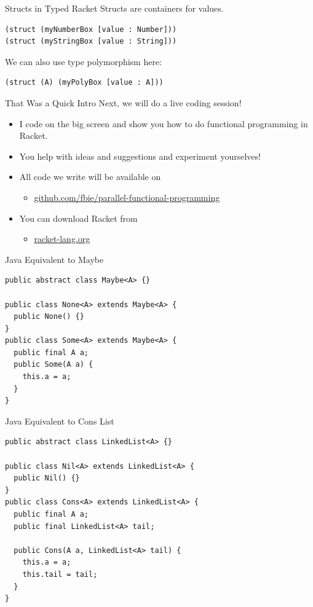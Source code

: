 \documentclass{beamer}
\begin{document}
\begin{frame}[fragile]{Structs in Typed Racket}
Structs are containers for values.

\begin{lstlisting}
(struct (myNumberBox [value : Number]))
(struct (myStringBox [value : String]))
\end{lstlisting}

\pause{}

We can also use type polymorphism here:

\begin{lstlisting}
(struct (A) (myPolyBox [value : A]))
\end{lstlisting}
\end{frame}

\begin{frame}{That Was a Quick Intro}
  Next, we will do a live coding session!

  \begin{itemize}
  \pause{} \item I code on the big screen and show you how to do functional programming in Racket.
  \pause{} \item You help with ideas and suggestions and experiment yourselves!
  \pause{} \item All code we write will be available on
  \begin{itemize}
  \item \url{github.com/fbie/parallel-functional-programming}
  \end{itemize}
  \pause{} \item You can download Racket from
  \begin{itemize}
  \item \url{racket-lang.org}
  \end{itemize}
  \end{itemize}
\end{frame}

\begin{frame}[fragile]{Java Equivalent to Maybe}
\begin{lstlisting}[style=Java]
public abstract class Maybe<A> {}

public class None<A> extends Maybe<A> {
  public None() {}
}
public class Some<A> extends Maybe<A> {
  public final A a;
  public Some(A a) {
    this.a = a;
  }
}
\end{lstlisting}
\end{frame}

\begin{frame}[fragile]{Java Equivalent to Cons List}
\begin{lstlisting}[style=Java]
public abstract class LinkedList<A> {}

public class Nil<A> extends LinkedList<A> {
  public Nil() {}
}
public class Cons<A> extends LinkedList<A> {
  public final A a;
  public final LinkedList<A> tail;

  public Cons(A a, LinkedList<A> tail) {
    this.a = a;
    this.tail = tail;
  }
}
\end{lstlisting}
\end{frame}
\end{document}
